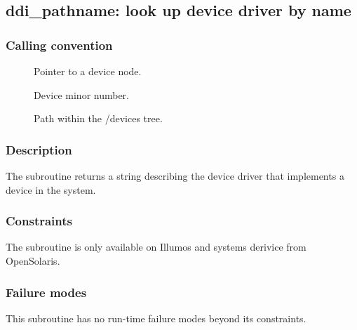 \clearpage
{}
{}
\label{subr:ddi_pathname}
\subsection*{ddi\_pathname: look up device driver by name}

\subsubsection*{Calling convention}

\begin{description}
\item[] Pointer to a device node.
\item[] Device minor number.
\item[] Path within the /devices tree.
\end{description}

\subsubsection*{Description}

The  subroutine returns a string describing
the device driver that implements a device in the system.

\subsubsection*{Constraints}

The  subroutine is only available on Illumos and
systems derivice from OpenSolaris.

\subsubsection*{Failure modes}

This subroutine has no run-time failure modes beyond its constraints.
